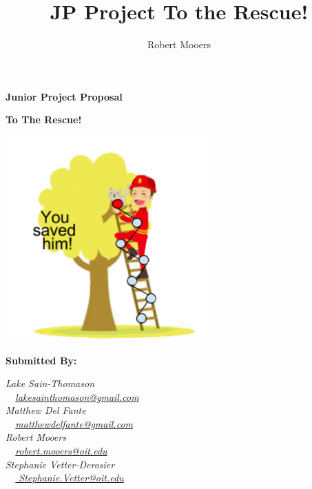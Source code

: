 \documentclass[12pt]{report}
\begin{document}
	
\title{JP Project To the Rescue!}
\author{Robert Mooers}

\begin{titlepage}
	\centering
	{\huge\bfseries
		Junior Project Proposal \par}
	{\huge\bfseries
		To The Rescue! \par}
	
	\vfill
	
	\includegraphics{Tree}
	
	\vspace{2cm}
	\begin{multicols}{2}
		{\Large\bfseries
			Submitted By: \par}
		\columnbreak
		\begin{flushleft}
		{	
			\Large\itshape Lake Sain-Thomason \\
			\ \ \normalsize\normalfont \href{mailto:lakesainthomason@gmail.com}{lakesainthomason@gmail.com} \\
			\Large\itshape Matthew Del Fante \\
			\ \ \normalsize\normalfont \href{mailto:matthewdelfante@gmail.com}{matthewdelfante@gmail.com} \\
			\Large\itshape Robert Mooers \\
			\ \ \normalsize\normalfont \href{mailto:Robert.Mooers@oit.edu}{robert.mooers@oit.edu} \\
			\Large\itshape Stephanie Vetter-Derosier \\
			\ \ \normalsize\normalfont \href{mailto: Stephanie.Vetter@oit.edu}{ Stephanie.Vetter@oit.edu}
		\par}
		\end{flushleft}
	\end{multicols}
	

\end{titlepage}
\end{document}

